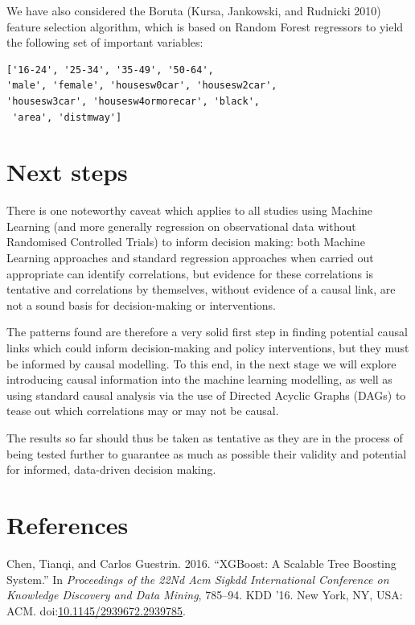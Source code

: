 \documentclass[]{article}
\begin{document}
We have also considered the Boruta (Kursa, Jankowski, and Rudnicki 2010)
feature selection algorithm, which is based on Random Forest regressors
to yield the following set of important variables:

\begin{verbatim}
['16-24', '25-34', '35-49', '50-64',
'male', 'female', 'housesw0car', 'housesw2car',
'housesw3car', 'housesw4ormorecar', 'black',
 'area', 'distmway']
\end{verbatim}

\section{Next steps}\label{next-steps}

There is one noteworthy caveat which applies to all studies using
Machine Learning (and more generally regression on observational data
without Randomised Controlled Trials) to inform decision making: both
Machine Learning approaches and standard regression approaches when
carried out appropriate can identify correlations, but evidence for
these correlations is tentative and correlations by themselves, without
evidence of a causal link, are not a sound basis for decision-making or
interventions.

The patterns found are therefore a very solid first step in finding
potential causal links which could inform decision-making and policy
interventions, but they must be informed by causal modelling. To this
end, in the next stage we will explore introducing causal information
into the machine learning modelling, as well as using standard causal
analysis via the use of Directed Acyclic Graphs (DAGs) to tease out
which correlations may or may not be causal.

The results so far should thus be taken as tentative as they are in the
process of being tested further to guarantee as much as possible their
validity and potential for informed, data-driven decision making.

\section*{References}\label{references}

\hypertarget{refs}{}
\hypertarget{ref-Chen:2016:XST:2939672.2939785}{}
Chen, Tianqi, and Carlos Guestrin. 2016. ``XGBoost: A Scalable Tree
Boosting System.'' In \emph{Proceedings of the 22Nd Acm Sigkdd
International Conference on Knowledge Discovery and Data Mining},
785--94. KDD '16. New York, NY, USA: ACM.
doi:\href{https://doi.org/10.1145/2939672.2939785}{10.1145/2939672.2939785}.
\end{document}
